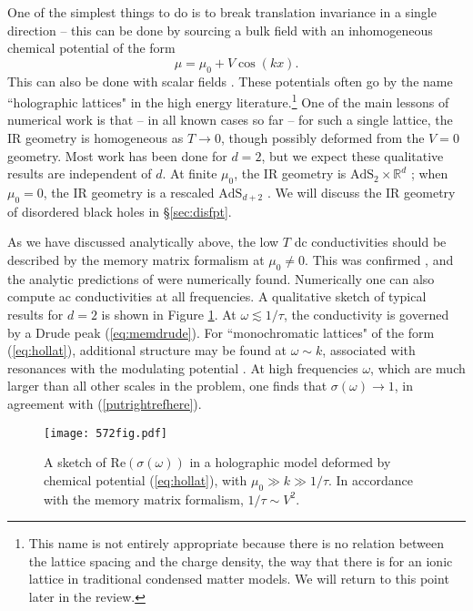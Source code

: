\documentclass[10pt, oneside]{book}
\begin{document}
\begin{doublespace}
One of the simplest things to do is to break translation invariance in a single direction -- this can be done by sourcing a bulk field with an inhomogeneous chemical potential of the form \cite{Horowitz:2012gs, Ling:2013nxa} \begin{equation}
\mu = \mu_0 + V\cos(kx).  \label{eq:hollat}
\end{equation}
This can also be done with scalar fields \cite{Horowitz:2012ky}.   These potentials often go by the name ``holographic lattices"  in the high energy literature.\footnote{This name is not entirely appropriate because there is no relation between the lattice spacing and the charge density, the way that there is for an ionic lattice in traditional condensed matter models.  We will return to this point later in the review.}  One of the main lessons of numerical work is that -- in all known cases so far -- for such a single lattice,  the IR geometry is homogeneous as $T\rightarrow 0$, though possibly deformed from the $V=0$ geometry.   Most work has been done for $d=2$, but we expect these qualitative results are independent of $d$.   At finite $\mu_0$,  the IR geometry is $\mathrm{AdS}_2 \times \mathbb{R}^d$ \cite{Donos:2014yya};  when $\mu_0=0$,  the IR geometry is a rescaled $\mathrm{AdS}_{d+2}$ \cite{Chesler:2013qla}.   We will discuss the IR geometry of disordered black holes in \S \ref{sec:disfpt}.

As we have discussed analytically above, the low $T$ dc conductivities should be described by the memory matrix formalism at $\mu_0 \ne 0$.   This was confirmed \cite{Horowitz:2012ky}, and the analytic predictions of \cite{Hartnoll:2012rj} were numerically found.    Numerically one can also compute ac conductivities at all frequencies.   A qualitative sketch of typical results for $d=2$ is shown in Figure \ref{fig:572}.    At $\omega \lesssim 1/\tau$,  the conductivity is governed by a Drude peak (\ref{eq:memdrude}).   For ``monochromatic lattices" of the form (\ref{eq:hollat}), additional structure may be found at $\omega \sim k$,  associated with resonances with the modulating potential \cite{Horowitz:2012gs, Chesler:2013qla}.   At high frequencies $\omega$, which are much larger than all other scales in the problem,  one finds that $\sigma(\omega)\rightarrow 1$, in agreement with (\ref{putrightrefhere}).

\begin{figure}[h]
\centering
\texttt{[image: 572fig.pdf]}
\caption{A sketch of $\mathrm{Re}(\sigma(\omega))$ in a holographic model deformed by chemical potential (\ref{eq:hollat}), with $\mu_0 \gg k \gg 1/\tau$.   In accordance with the memory matrix formalism, $1/\tau \sim V^2$.}
\label{fig:572}
\end{figure}


\end{doublespace}
\end{document}
